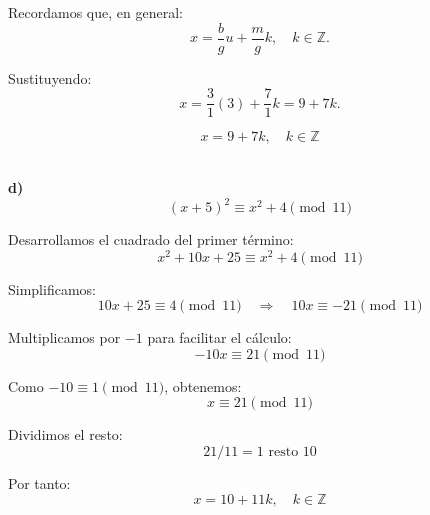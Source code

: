 \documentclass[a4paper,12pt]{article}
\begin{document}
\begin{ejercicio}[title=Ejercicio 32]

\vspace{0.5em}

Recordamos que, en general:
\[
x = \frac{b}{g}u + \frac{m}{g}k, \quad k\in\mathbb{Z}.
\]

Sustituyendo:
\[
x = \frac{3}{1}(3) + \frac{7}{1}k = 9 + 7k.
\]

\[
\boxed{x = 9 + 7k, \quad k \in \mathbb{Z}}
\]

\vspace{1em} \\

\textbf{d)} \\[0.3em]
\[
(x + 5)^2 \equiv x^2 + 4 \pmod{11}
\]

Desarrollamos el cuadrado del primer término:
\[
x^2 + 10x + 25 \equiv x^2 + 4 \pmod{11}
\]

Simplificamos:
\[
10x + 25 \equiv 4 \pmod{11} \quad \Rightarrow \quad 10x \equiv -21 \pmod{11}
\]

Multiplicamos por $-1$ para facilitar el cálculo:
\[
-10x \equiv 21 \pmod{11}
\]

Como $-10 \equiv 1 \pmod{11}$, obtenemos:
\[
x \equiv 21 \pmod{11}
\]

Dividimos el resto:
\[
21 / 11 = 1 \text{ resto } 10
\]

Por tanto:
\[
\boxed{x = 10 + 11k, \quad k \in \mathbb{Z}}
\]

\end{ejercicio}
\end{document}
